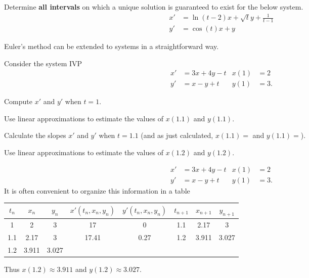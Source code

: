 \begin{applicationActivities}
\begin{activity}{5}
Determine \textbf{all intervals} on which a unique solution is guaranteed to exist for the below system.
\begin{align*}
x' &= \ln(t-2) x + \sqrt{t} y + \frac{1}{t-1}  \\
y' &= \cos(t) x +  y  
\end{align*}

\end{activity}


\begin{activity}{10}
Euler's method can be extended to systems in a straightforward way.
\vfill

Consider the system IVP
\begin{align*}
x' &= 3x+4y-t & x(1)&=2 \\
y' &= x-y+t & y(1)&=3 .
\end{align*}

\begin{subactivity}
Compute \(x'\) and \(y'\)  when \(t=1\).
\end{subactivity}
\begin{subactivity}
Use linear approximations to estimate the values of \(x(1.1)\) and \(y(1.1)\).
\end{subactivity}
\begin{subactivity}
Calculate the slopes \(x'\) and \(y'\) when \(t=1.1\) (and as just calculated, \(x(1.1)=\) and \(y(1.1)=\)). 
\end{subactivity}
\begin{subactivity}
Use linear approximations to estimate the values of \(x(1.2)\) and \(y(1.2)\).
\end{subactivity}
\end{activity}

\begin{observation}
\begin{align*}
x' &= 3x+4y-t & x(1)&=2 \\
y' &= x-y+t & y(1)&=3 .
\end{align*}
\vfill
It is often convenient to organize this information in a table
\begin{center}
\begin{tabular}{c|c|c||c|c||c|c|c|}
\(t_n\) & \(x_n\) & \(y_n\) & \(x'(t_n,x_n,y_n)\) &  \(y'(t_n,x_n,y_n)\) & \(t_{n+1}\) & \(x_{n+1}\) & \(y_{n+1}\) \\ \hline \hline
1 & 2 & 3 & 17 & 0 & 1.1 & 2.17 & 3  \\ \hline
1.1 & 2.17 & 3 & 17.41 & 0.27 & 1.2 & 3.911 & 3.027 \\ \hline
1.2 & 3.911 & 3.027 &  &  &  &  &  \\ \hline
\end{tabular}
\end{center}
\vfill
Thus \(x(1.2) \approx 3.911\) and \(y(1.2) \approx 3.027\).
\end{observation}


\end{applicationActivities}
